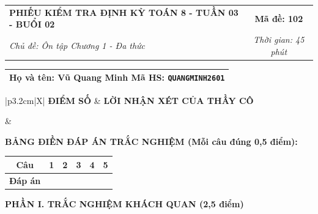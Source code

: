 \documentclass[12pt,a4paper]{article}
\begin{document}
\newpage


\noindent
\begin{tabularx}{\linewidth}{|X|c|}
\hline
\textbf{PHIẾU KIỂM TRA ĐỊNH KỲ TOÁN 8 - TUẦN 03 - BUỔI 02} & \textbf{Mã đề: 102} \\
\textit{Chủ đề: Ôn tập Chương 1 - Đa thức} & \textit{Thời gian: 45 phút} \\
\hline
\end{tabularx}

\vspace{1mm}

\noindent
\begin{tabularx}{\linewidth}{|X|}
\hline
\rule[-2mm]{0pt}{7.5mm}\textbf{Họ và tên:} \textbf{\large Vũ Quang Minh} \hfill \textbf{Mã HS:} \texttt{QUANGMINH2601} \quad \\
\hline
\end{tabularx}

\vspace{1mm}

\noindent
\begin{tabularx}{\linewidth}{|p{3.2cm}|X|}
\hline
\centering\textbf{ĐIỂM SỐ} & \centering\textbf{LỜI NHẬN XÉT CỦA THẦY CÔ} \tabularnewline
\hline
\rule{0pt}{1.3cm} & \tabularnewline
\hline
\end{tabularx}

\vspace{1.2mm}

\noindent\textbf{BẢNG ĐIỀN ĐÁP ÁN TRẮC NGHIỆM (Mỗi câu đúng 0,5 điểm):}
\vspace{0.8mm}

\noindent
\renewcommand{\arraystretch}{1.35}
\begin{tabularx}{\linewidth}{|c|*{5}{>{\centering\arraybackslash}X|}}
\hline
\textbf{Câu} & \textbf{1} & \textbf{2} & \textbf{3} & \textbf{4} & \textbf{5} \\
\hline
\textbf{Đáp án} & & & & & \\
\hline
\end{tabularx}
\renewcommand{\arraystretch}{1.0}

\vspace{1.5mm}

\noindent\textbf{\large PHẦN I. TRẮC NGHIỆM KHÁCH QUAN (2,5 điểm)}
\vspace{1mm}
\end{document}
